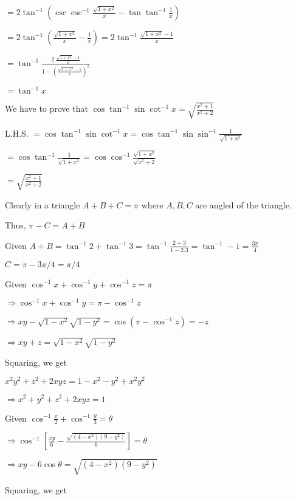   $= 2\tan^{-1}\left(\csc\csc^{-1}\frac{\sqrt{1 + x^2}}{x} - \tan\tan^{-1}\frac{1}{x}\right)$

  $= 2\tan^{-1}\left(\frac{\sqrt{1 + x^2}}{x} - \frac{1}{x}\right) = 2\tan^{-1}\frac{\sqrt{1 + x^2} - 1}{x}$

  $= \tan^{-1}\frac{2.\frac{\sqrt{1 + x^2} - 1}{x}}{1 - \left(\frac{\sqrt{1 + x^2} - 1}{x}\right)^2}$

  $= \tan^{-1}x$

\item We have to prove that $\cos\tan^{-1}\sin\cot^{-1}x = \sqrt{\frac{x^2 + 1}{x^2 + 2}}$

  L.H.S. $= \cos\tan^{-1}\sin\cot^{-1}x = \cos\tan^{-1}\sin\sin^{-1}\frac{1}{\sqrt{1 + x^2}}$

  $= \cos\tan^{-1}\frac{1}{\sqrt{1 + x^2}} = \cos\cos^{-1}\frac{\sqrt{1 + x^2}}{\sqrt{x^2 + 2}}$

  $= \sqrt{\frac{x^2 + 1}{x^2 + 2}}$

\item Clearly in a triangle $A + B + C = \pi$ where $A, B, C$ are angled of the triangle.

  Thus, $\pi - C = A + B$

  Given $A + B = \tan^{-1}2 + \tan^{-1}3 = \tan^{-1}\frac{2 + 3}{1 - 2.3} = \tan^{-1}-1 = \frac{3\pi}{4}$

  $C = \pi - 3\pi/4 = \pi/4$

\item Given $\cos^{-1}x + \cos^{-1}y + \cos^{-1}z = \pi$

  $\Rightarrow \cos^{-1}x + \cos^{-1}y = \pi - \cos^{-1}z$

  $\Rightarrow xy - \sqrt{1 - x^2}\sqrt{1 - y^2} = \cos(\pi - \cos^{-1}z) = -z$

  $\Rightarrow xy + z = \sqrt{1 - x^2}\sqrt{1 - y^2}$

  Squaring, we get

  $x^2y^2 + z^2 + 2xyz = 1 - x^2 - y^2 + x^2y^2$

  $\Rightarrow x^2 + y^2 + z^2 + 2xyz = 1$

\item Given $\cos^{-1}\frac{x}{2}+ \cos^{-1}\frac{y}{3} = \theta$

  $\Rightarrow \cos^{-1}\left[\frac{xy}{6} - \frac{\sqrt{(4 - x^2)(9 - y^2)}}{6}\right] = \theta$

  $\Rightarrow xy - 6\cos\theta = \sqrt{(4 - x^2)(9 - y^2)}$

  Squaring, we get

